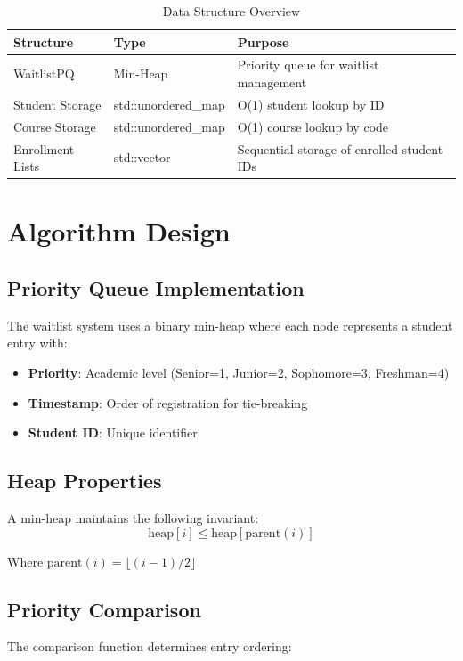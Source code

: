 \documentclass[12pt,a4paper]{article}
\begin{document}
\begin{table}[h]
\centering
\begin{tabular}{@{}lll@{}}
\toprule
\textbf{Structure} & \textbf{Type} & \textbf{Purpose} \\
\midrule
WaitlistPQ & Min-Heap & Priority queue for waitlist management \\
Student Storage & std::unordered\_map & O(1) student lookup by ID \\
Course Storage & std::unordered\_map & O(1) course lookup by code \\
Enrollment Lists & std::vector & Sequential storage of enrolled student IDs \\
\bottomrule
\end{tabular}
\caption{Data Structure Overview}
\end{table}

\section{Algorithm Design}

\subsection{Priority Queue Implementation}

The waitlist system uses a binary min-heap where each node represents a student entry with:
\begin{itemize}
    \item \textbf{Priority}: Academic level (Senior=1, Junior=2, Sophomore=3, Freshman=4)
    \item \textbf{Timestamp}: Order of registration for tie-breaking
    \item \textbf{Student ID}: Unique identifier
\end{itemize}

\subsection{Heap Properties}
A min-heap maintains the following invariant:
\begin{equation}
\text{heap}[i] \leq \text{heap}[\text{parent}(i)]
\end{equation}

Where $\text{parent}(i) = \lfloor (i-1)/2 \rfloor$

\subsection{Priority Comparison}
The comparison function determines entry ordering:
\end{document}
